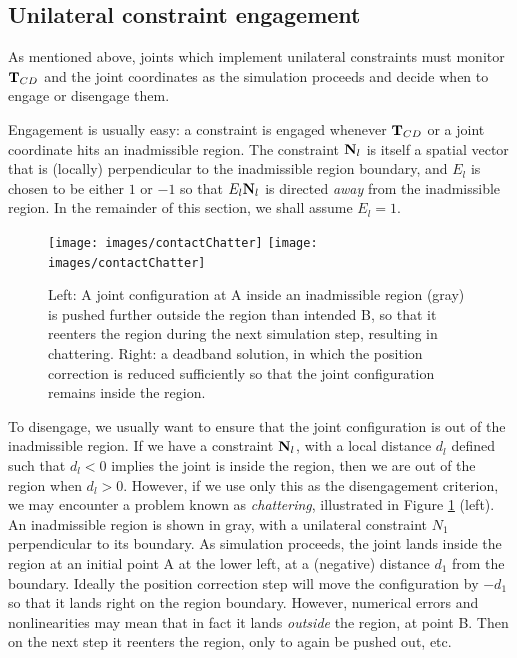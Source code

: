 \subsection{Unilateral constraint engagement}
\label{UnilateralEngagement:sec}

As mentioned above, joints which implement unilateral constraints must
monitor ${\bf T}_{CD}$ and the joint coordinates as the simulation proceeds
and decide when to engage or disengage them.

Engagement is usually easy: a constraint is engaged whenever ${\bf T}_{CD}$
or a joint coordinate hits an inadmissible region. The constraint
${\bf N}_l$ is itself a spatial vector that is (locally) perpendicular to
the inadmissible region boundary, and $E_l$ is chosen to be either
$1$ or $-1$ so that $E_l {\bf N}_l$ is directed {\it away} from the
inadmissible region. In the remainder of this section, we shall assume
$E_l = 1$.

\begin{figure}[ht]
\begin{center}
\iflatexml
 \texttt{[image: images/contactChatter]}
\else
 \texttt{[image: images/contactChatter]}
\fi
\end{center}
\caption{Left: A joint configuration at A inside an inadmissible
region (gray) is pushed further outside the region than intended B,
so that it reenters the region during the next simulation step,
resulting in chattering. Right: a deadband solution, in which the
position correction is reduced sufficiently so that the joint
configuration remains inside the region.}
\label{contactChatter:fig}
\end{figure}

To disengage, we usually want to ensure that the joint configuration
is out of the inadmissible region. If we have a constraint ${\bf N}_l$,
with a local distance $d_l$ defined such that $d_l < 0$ implies the
joint is inside the region, then we are out of the region when
$d_l > 0$.  However, if we use only this as the disengagement
criterion, we may encounter a problem known as {\it chattering},
illustrated in Figure \ref{contactChatter:fig} (left). An inadmissible
region is shown in gray, with a unilateral constraint $N_1$
perpendicular to its boundary. As simulation proceeds, the joint lands
inside the region at an initial point A at the lower left, at a
(negative) distance $d_1$ from the boundary. Ideally the position
correction step will move the configuration by $-d_1$ so that it lands
right on the region boundary. However, numerical errors and
nonlinearities may mean that in fact it lands {\it outside} the
region, at point B. Then on the next step it reenters the region, only
to again be pushed out, etc.

